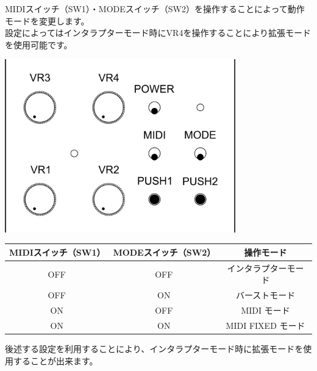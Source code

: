 \documentclass[a4paper,11pt]{jsarticle}
\begin{document}
MIDIスイッチ（SW1）・MODEスイッチ（SW2）を操作することによって動作モードを変更します。 \\
設定によってはインタラプターモード時にVR4を操作することにより拡張モードを使用可能です。 \\


\vspace*{5mm}
\begin{center}
\includegraphics[width=100mm]{image/Arduino_Interrupter_v1_Design_Interface.png}
\end{center}
\vspace*{5mm}


\begin{table}[htbp]
\begin{center}
\begin{tabular}{ | c | c |  c | }
\hline
\textbf{MIDIスイッチ（SW1）} & \textbf{MODEスイッチ（SW2）} & \textbf{操作モード} \\\hline
OFF & OFF & インタラプターモード \\\hline
OFF & ON & バーストモード \\\hline
ON & OFF & MIDI モード \\\hline
ON & ON & MIDI FIXED モード \\\hline
\end{tabular}
\end{center}
\end{table}


後述する設定を利用することにより、インタラプターモード時に拡張モードを使用することが出来ます。 \\
\end{document}
